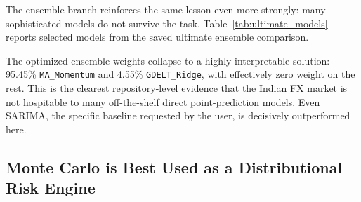 \documentclass[11pt,a4paper]{article}
\begin{document}
The ensemble branch reinforces the same lesson even more strongly: many sophisticated models do not survive the task. Table~\ref{tab:ultimate_models} reports selected models from the saved ultimate ensemble comparison.

\begin{table}[t]
\centering
\small
\caption{Selected models from \texttt{ensemble\_model/output/ultimate\_model\_metrics.csv}.}
\label{tab:ultimate_models}
\end{table}

The optimized ensemble weights collapse to a highly interpretable solution: 95.45\% \texttt{MA\_Momentum} and 4.55\% \texttt{GDELT\_Ridge}, with effectively zero weight on the rest. This is the clearest repository-level evidence that the Indian FX market is not hospitable to many off-the-shelf direct point-prediction models. Even SARIMA, the specific baseline requested by the user, is decisively outperformed here.

\subsection{Monte Carlo is Best Used as a Distributional Risk Engine}
\end{document}
